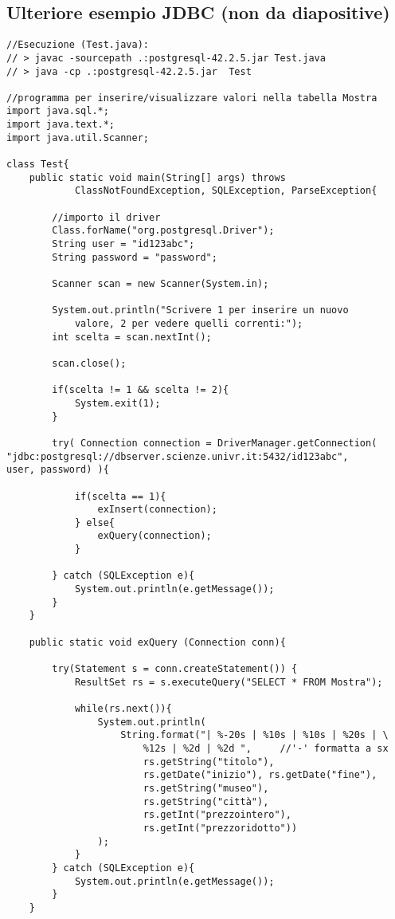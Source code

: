 \documentclass[a4paper, 10pt, titlepage]{article}
\begin{document}
\subsection*{Ulteriore esempio JDBC (non da diapositive)}
\begin{lstlisting}
//Esecuzione (Test.java):
// > javac -sourcepath .:postgresql-42.2.5.jar Test.java
// > java -cp .:postgresql-42.2.5.jar  Test

//programma per inserire/visualizzare valori nella tabella Mostra
import java.sql.*;
import java.text.*;
import java.util.Scanner;

class Test{
    public static void main(String[] args) throws
    		ClassNotFoundException, SQLException, ParseException{
    		
        //importo il driver
        Class.forName("org.postgresql.Driver");
        String user = "id123abc";
        String password = "password";

        Scanner scan = new Scanner(System.in);
        
        System.out.println("Scrivere 1 per inserire un nuovo
        	valore, 2 per vedere quelli correnti:");
        int scelta = scan.nextInt();
        
		scan.close();
		
        if(scelta != 1 && scelta != 2){
            System.exit(1);
        }

        try( Connection connection = DriverManager.getConnection(
"jdbc:postgresql://dbserver.scienze.univr.it:5432/id123abc", 
user, password) ){

            if(scelta == 1){
                exInsert(connection);
            } else{
                exQuery(connection);
            }

        } catch (SQLException e){
            System.out.println(e.getMessage());
        }
    }

    public static void exQuery (Connection conn){

        try(Statement s = conn.createStatement()) {
            ResultSet rs = s.executeQuery("SELECT * FROM Mostra");
            
            while(rs.next()){
                System.out.println(
                    String.format("| %-20s | %10s | %10s | %20s | \
                    	%12s | %2d | %2d ",		//'-' formatta a sx  
                    	rs.getString("titolo"),
                    	rs.getDate("inizio"), rs.getDate("fine"),
                    	rs.getString("museo"),
                    	rs.getString("città"),
                    	rs.getInt("prezzointero"),
                    	rs.getInt("prezzoridotto"))
                );
            }
        } catch (SQLException e){
            System.out.println(e.getMessage());
        }
    }


\end{lstlisting}
\end{document}
